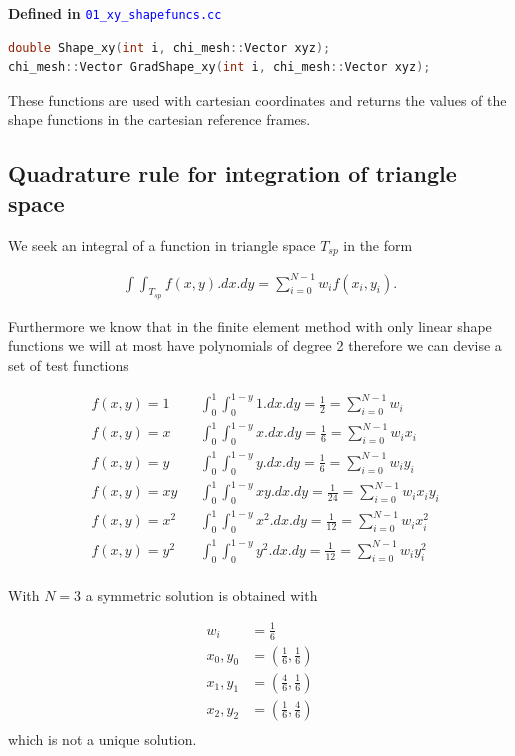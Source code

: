 \documentclass[11pt,letterpaper,titlepage]{article}
\newcommand{\beq}{\begin{equation*}
\begin{aligned}}
\newcommand{\eeq}{\end{aligned}
\end{equation*}}
\newcommand{\xmltag}[1]{\textcolor{blue}{ \texttt{#1}} }
\begin{document}
\vspace{0.5cm}
\textbf{Defined in } \xmltag{01\_xy\_shapefuncs.cc}
\begin{lstlisting}[language=c++]
double Shape_xy(int i, chi_mesh::Vector xyz);
chi_mesh::Vector GradShape_xy(int i, chi_mesh::Vector xyz);
\end{lstlisting}

These functions are used with cartesian coordinates and returns the values of the shape functions in the cartesian reference frames.






\newpage
{}
\begin{appendices}
\renewcommand{\thefigure}{D\arabic{section}.\arabic{figure}}
\section{Quadrature rule for integration of triangle space} \label{appendix:trianglequadrature}
We seek an integral of a function in triangle space $T_{sp}$ in the form

\beq 
\int \int_{T_{sp}} f(x,y).dx.dy = \sum_{i=0}^{N-1} w_i f(x_i,y_i).
\eeq 

Furthermore we know that in the finite element method with only linear shape functions we will at most have polynomials of degree 2 therefore we can devise a set of test functions

\beq 
&f(x,y) = 1    &&\int_{0}^1 \int_0^{1-y} 1.dx.dy = \frac{1}{2} = \sum_{i=0}^{N-1} w_i\\
&f(x,y) = x    &&\int_{0}^1 \int_0^{1-y} x.dx.dy = \frac{1}{6} = \sum_{i=0}^{N-1} w_i x_i\\
&f(x,y) = y    &&\int_{0}^1 \int_0^{1-y} y.dx.dy = \frac{1}{6} = \sum_{i=0}^{N-1} w_i y_i\\
&f(x,y) = xy  & &\int_{0}^1 \int_0^{1-y} xy.dx.dy = \frac{1}{24} = \sum_{i=0}^{N-1} w_i x_i y_i\\
&f(x,y) = x^2    &&\int_{0}^1 \int_0^{1-y} x^2.dx.dy = \frac{1}{12} = \sum_{i=0}^{N-1} w_i x_i^2\\
&f(x,y) = y^2    &&\int_{0}^1 \int_0^{1-y} y^2.dx.dy = \frac{1}{12} = \sum_{i=0}^{N-1} w_i y_i^2\\
\eeq 

With $N=3$ a symmetric solution is obtained with

\beq
w_i &= \frac{1}{6} \\
x_0,y_0 &= ( \frac{1}{6}, \frac{1}{6}) \\
x_1,y_1 &= ( \frac{4}{6}, \frac{1}{6}) \\
x_2,y_2 &= ( \frac{1}{6}, \frac{4}{6}) \\
\eeq 
which is not a unique solution.


\end{appendices}
\end{document}
